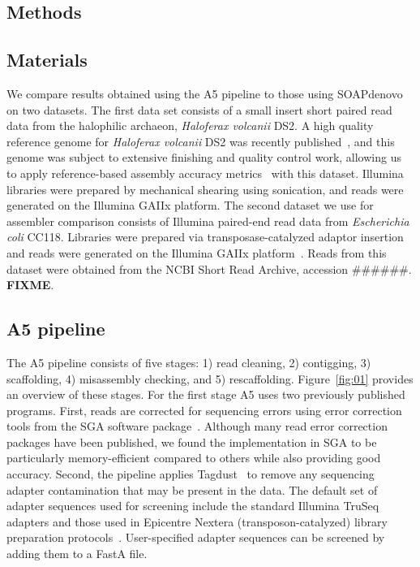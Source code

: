 \documentclass{bioinfo}
\begin{document}
\begin{methods}
\section{Methods}
\subsection{Materials}

We compare results obtained using the A5 pipeline to those using SOAPdenovo on two datasets. 
The first data set consists of a small insert 
short paired read data from the halophilic archaeon, \emph{Haloferax volcanii} DS2. 
A high quality reference genome for \emph{Haloferax volcanii} DS2 was recently published~\citep{Hartman2010},
and this genome was subject to extensive finishing and quality control work, allowing us to apply
reference-based assembly accuracy metrics~\citep{Darling2011} with this dataset.
Illumina libraries were prepared by mechanical shearing using sonication, and reads were generated on
the Illumina GAIIx platform. 
The second dataset we use for assembler comparison consists of Illumina paired-end read data from \emph{Escherichia 
coli} CC118. Libraries were prepared via transposase-catalyzed adaptor insertion and reads 
were generated on the Illumina GAIIx platform~\citep{Adey2010}. Reads from this dataset were obtained from
the NCBI Short Read Archive, accession \#\#\#\#\#\#. \textbf{FIXME}.

\subsection{A5 pipeline}

The A5 pipeline consists of five stages: 1) read cleaning, 2) contigging, 3) scaffolding,
4) misassembly checking, and 5) rescaffolding. Figure~\ref{fig:01} provides an overview of these stages. 
For the first stage A5 uses two previously
published programs. First, reads are corrected for sequencing errors using error correction tools 
from the SGA software package~\citep{Simpson2010}.  Although many read error correction packages have been published,
we found the implementation in SGA to be particularly memory-efficient compared to others while also providing 
good accuracy.  Second, the pipeline applies Tagdust~\citep{Lassmann2009} to remove any 
sequencing adapter contamination that may be present in the data. The default set of adapter sequences used for screening
include the standard Illumina TruSeq adapters and those used in Epicentre Nextera (transposon-catalyzed) library preparation protocols~\citep{Adey2010}. 
User-specified adapter sequences can be screened by adding them to a FastA file. 


\end{methods}
\end{document}
